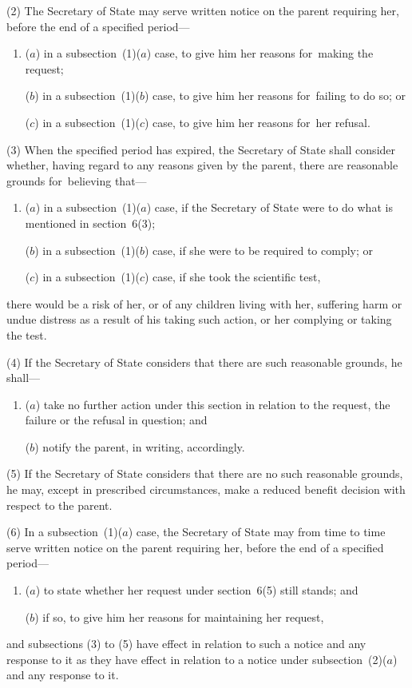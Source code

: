 \documentclass[12pt,a4paper]{article}
\begin{document}
(2) The Secretary of State may serve written notice on the parent requiring her, before the end of a specified period—
\begin{enumerate}\item[]
($a$) in a subsection~(1)($a$)  case, to give him her reasons for~making the request;

($b$) in a subsection~(1)($b$)  case, to give him her reasons for~failing to do so; or

($c$) in a subsection~(1)($c$)  case, to give him her reasons for~her refusal.
\end{enumerate}

(3) When the specified period has expired, the Secretary of State shall consider whether, having regard to any reasons given by the parent, there are reasonable grounds for~believing that—
\begin{enumerate}\item[]
($a$) in a subsection~(1)($a$)  case, if the Secretary of State were to do what is mentioned in section~6(3);

($b$) in a subsection~(1)($b$)  case, if she were to be required to comply; or

($c$) in a subsection~(1)($c$)  case, if she took the scientific test,
\end{enumerate}
there would be a risk of her, or of any children living with her, suffering harm or undue distress as a result of his taking such action, or her complying or taking the test.

(4) If the Secretary of State considers that there are such reasonable grounds, he shall—
\begin{enumerate}\item[]
($a$) take no further action under this section in relation to the request, the failure or the refusal in question; and

($b$) notify the parent, in writing, accordingly.
\end{enumerate}

(5) If the Secretary of State considers that there are no such reasonable grounds, he may, except in prescribed circumstances, make a reduced benefit decision with respect to the parent.

(6) In a subsection~(1)($a$)  case, the Secretary of State may from time to time serve written notice on the parent requiring her, before the end of a specified period—
\begin{enumerate}\item[]
($a$) to state whether her request under section~6(5)  still stands; and

($b$) if so, to give him her reasons for maintaining her request,
\end{enumerate}
and subsections (3)  to (5)  have effect in relation to such a notice and any response to it as they have effect in relation to a notice under subsection~(2)($a$)  and any response to it.
\end{document}
